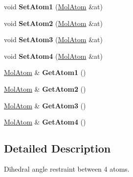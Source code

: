 \begin{DoxyCompactItemize}
void {\bfseries Set\+Atom1} (\mbox{\hyperlink{class_obj_cryst_1_1_mol_atom}{Mol\+Atom}} \&at)
\item 
\mbox{\label{class_obj_cryst_1_1_mol_dihedral_angle_abfd911db850ae2b50a8e23efb82597fc}} 
void {\bfseries Set\+Atom2} (\mbox{\hyperlink{class_obj_cryst_1_1_mol_atom}{Mol\+Atom}} \&at)
\item 
\mbox{\label{class_obj_cryst_1_1_mol_dihedral_angle_aa012bfe98cca9eb980511eb5a86cb954}} 
void {\bfseries Set\+Atom3} (\mbox{\hyperlink{class_obj_cryst_1_1_mol_atom}{Mol\+Atom}} \&at)
\item 
\mbox{\label{class_obj_cryst_1_1_mol_dihedral_angle_a46547a5dd324aefb35cf6a5e2e62470b}} 
void {\bfseries Set\+Atom4} (\mbox{\hyperlink{class_obj_cryst_1_1_mol_atom}{Mol\+Atom}} \&at)
\item 
\mbox{\label{class_obj_cryst_1_1_mol_dihedral_angle_a38338a9c07282dfe1fdd120eacdeb340}} 
\mbox{\hyperlink{class_obj_cryst_1_1_mol_atom}{Mol\+Atom}} \& {\bfseries Get\+Atom1} ()
\item 
\mbox{\label{class_obj_cryst_1_1_mol_dihedral_angle_a8fe4d2325f3107d5b3739f8e732b8303}} 
\mbox{\hyperlink{class_obj_cryst_1_1_mol_atom}{Mol\+Atom}} \& {\bfseries Get\+Atom2} ()
\item 
\mbox{\label{class_obj_cryst_1_1_mol_dihedral_angle_a8f666bd256b025500359a20f6c0d15f5}} 
\mbox{\hyperlink{class_obj_cryst_1_1_mol_atom}{Mol\+Atom}} \& {\bfseries Get\+Atom3} ()
\item 
\mbox{\label{class_obj_cryst_1_1_mol_dihedral_angle_a08a9bdffd2abf13971fdaf636ffd91ca}} 
\mbox{\hyperlink{class_obj_cryst_1_1_mol_atom}{Mol\+Atom}} \& {\bfseries Get\+Atom4} ()
\end{DoxyCompactItemize}


\subsection{Detailed Description}
Dihedral angle restraint between 4 atoms.

